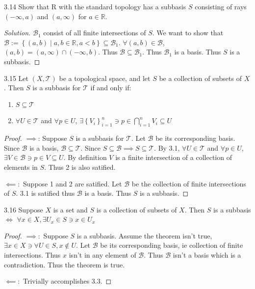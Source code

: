 \documentclass{article}
\newcommand*{\T}{\mathcal{T}}
\newcommand*{\B}{\mathcal{B}}
\newcommand{\R}{\mathbb{R}}
\newenvironment{solution}
{\renewcommand\qedsymbol{$\blacksquare$}\begin{proof}[Solution]}
{\end{proof}}
\begin{document}
\bigskip

\begin{PROB}{3.14}\label{Problem 3.14.}
    Show that R with the standard topology has a subbasis $S$ consisting of rays $(-\infty, a)$  and $(a, \infty)$ for $a \in \R$.
\end{PROB}
\begin{solution}
    $\B_1$ consist of all finite intersections of $S$. We want to show that $\B := \left\{ (a, b) \mid a, b \in \R, a < b \right\} \subseteq \B_1$. $\forall (a, b) \in \B$, $(a, b) = (a, \infty) \cap (-\infty, b)$. Thus $\B \subseteq \B_1$. Thus $\B_1$ is a basis. Thus $S$ is a subbasis.          
\end{solution}

\bigskip

\begin{claim}{3.15}\label{Claim 3.15.}
    Let $(X, \T)$ be a topological space, and let $S$ be a collection of subsets of $X$. Then $S$ is a subbasis for $\T$ if and only if:
    
    \begin{enumerate}
        \item $S \subseteq \T$
        \item $\forall U \in \T$ and $\forall p \in U$, $\exists \left\{ V_i \right\}_{i = 1}^{n}\ni p \in \bigcap_{i = 1}^{n} V_i \subseteq U$    
    \end{enumerate}
\end{claim}
\begin{proof}
    $\implies$: Suppose $S$ is a subbasis for $\T$. Let $\B$ be its corresponding basis. Since $\B$ is a basis, $\B \subseteq \T$. Since $S \subseteq \B \implies S \subseteq \T$. By 3.1, $\forall U \in \T$ and $\forall p \in U$, $\exists V \in \B \ni p \in V \subseteq U$. By definition $V$ is a finite intersection of a collection of elements in $S$. Thus 2 is also satified. 
    
    $\impliedby:$ Suppose 1 and 2 are satified. Let $\B$ be the collection of finite intersections of $S$. 3.1 is satified thus $\B$ is a basis. Thus $S$ is a subbasis.      
\end{proof}

\bigskip

\begin{claim}{3.16}\label{Claim 3.16.}
    Suppose $X$ is a set and $S$ is a collection of subsets of $X$. Then $S$ is a subbasis $\iff$ $\forall x \in X, \exists U_x \in S \ni x \in U_x$       
\end{claim}
\begin{proof}
    $\implies:$ Suppose $S$ is a subbasis. Assume the theorem isn't true, $\exists x \in X \ni \forall U \in S, x \not \in U$. Let $\B$ be its corresponding basis, ie collection of finite intersections. Thus $x$ isn't in any element of $\B$. Thus $\B$ isn't a basis which is a contradiction. Thus the theorem is true. 
    
    $\impliedby:$ Trivially accomplishes 3.3.   
\end{proof}
\end{document}
